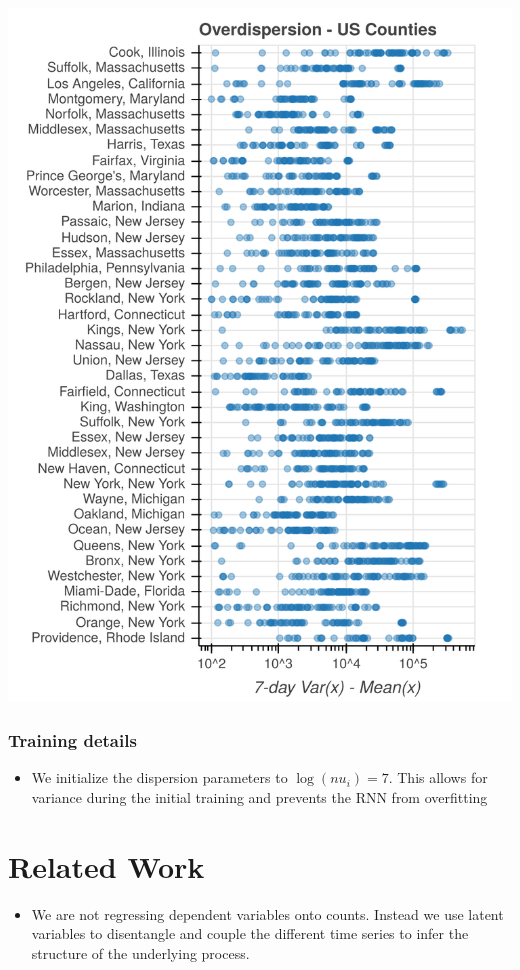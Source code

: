 \documentclass{article}
\begin{document}
\begin{minipage}{.45\linewidth}
\begin{center}
\includegraphics[width=\columnwidth]{img/overdispersion_counties.png}
\end{center}
\end{minipage}

\subsubsection{Training details}
\label{sec:org0c53443}
\begin{itemize}
\item We initialize the dispersion parameters to \(\log(nu_i) = 7\). This allows for
variance during the initial training and prevents the RNN from overfitting
\end{itemize}

\section{Related Work}
\label{sec:org4d03be1}
\cite{lloyd_smith2007negativebinomial}
\begin{itemize}
\item We are not regressing dependent variables onto counts. Instead we use latent
variables to disentangle and couple the different time series to infer the
structure of the underlying process.
\end{itemize}
\end{document}
